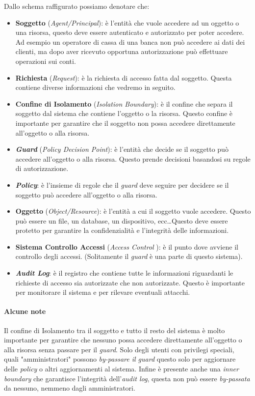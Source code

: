     Dallo schema raffigurato possiamo denotare che:
    \begin{itemize}
        \item \textbf{Soggetto} (\textit{Agent/Principal}): è l'entità che vuole accedere ad un oggetto o una risorsa, questo deve essere autenticato e autorizzato per poter accedere. Ad esempio un operatore di cassa di una banca non può accedere ai dati dei clienti, ma dopo aver ricevuto opportuna autorizzazione può effettuare operazioni sui conti.
        \item \textbf{Richiesta} (\textit{Request}): è la richiesta di accesso fatta dal soggetto. Questa contiene diverse informazioni che vedremo in seguito.
        \item \textbf{Confine di Isolamento} (\textit{Isolation Boundary}): è il confine che separa il soggetto dal sistema che contiene l'oggetto o la risorsa. Questo confine è importante per garantire che il soggetto non possa accedere direttamente all'oggetto o alla risorsa.
        \item \textit\textbf{Guard} (\textit{Policy Decision Point}): è l'entità che decide se il soggetto può accedere all'oggetto o alla risorsa. Questo prende decisioni basandosi su regole di autorizzazione.  
        \item \textit\textbf{Policy}: è l'insieme di regole che il \textit{guard} deve seguire per decidere se il soggetto può accedere all'oggetto o alla risorsa.
        \item \textbf{Oggetto} (\textit{Object/Resource}): è l'entità a cui il soggetto vuole accedere. Questo può essere un file, un database, un dispositivo, ecc\dots Questo deve essere protetto per garantire la confidenzialità e l'integrità delle informazioni.
        \item \textbf{Sistema Controllo Accessi} (\textit{Access Control }): è il punto dove avviene il controllo degli accessi. (Solitamente il \textit{guard} è una parte di questo sistema).
        \item \textit\textbf{Audit Log}: è il registro che contiene tutte le informazioni riguardanti le richieste di accesso sia autorizzate che non autorizzate. Questo è importante per monitorare il sistema e per rilevare eventuali attacchi.
    \end{itemize}
    
    \paragraph{Alcune note} Il confine di Isolamento tra il soggetto e tutto il resto del sistema è molto importante per garantire che nessuno possa accedere direttamente all'oggetto o alla risorsa senza passare per il \textit{guard}. Solo degli utenti con privilegi speciali, quali "amministratori" possono \textit{by-passare il guard} questo solo per aggiornare delle \textit{policy} o altri aggiornamenti al sistema. Infine è presente anche una \textit{inner boundary} che garantisce l'integrità dell'\textit{audit log}, questa non può essere \textit{by-passata} da nessuno, nemmeno dagli amministratori.
